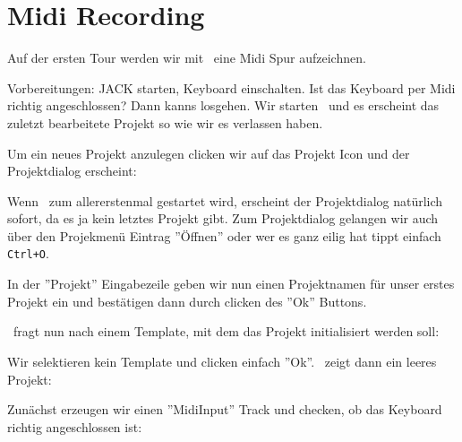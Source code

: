 \section{Midi Recording}
      Auf der ersten Tour werden wir mit \M\ eine Midi Spur
      aufzeichnen.

      Vorbereitungen: JACK starten, Keyboard einschalten. 
      Ist das Keyboard per Midi richtig angeschlossen? 
      Dann kanns losgehen. Wir starten \M\ und es erscheint das
      zuletzt bearbeitete Projekt so wie wir es verlassen haben.

      Um ein neues Projekt anzulegen clicken wir auf das Projekt
      Icon und der Projektdialog erscheint:


      Wenn \M\ zum allererstenmal gestartet wird, erscheint der
      Projektdialog natürlich sofort, da es ja kein letztes Projekt
      gibt. Zum Projektdialog gelangen wir auch über den Projekmenü
      Eintrag ''Öffnen'' oder wer es ganz eilig hat tippt einfach
      {\tt Ctrl+O}.

      In der ''Projekt'' Eingabezeile geben wir nun einen Projektnamen
      für unser erstes Projekt ein und bestätigen dann durch clicken
      des ''Ok'' Buttons.

      \M\ fragt nun nach einem Template, mit dem das Projekt
      initialisiert werden soll:


      Wir selektieren kein Template und clicken einfach ''Ok''.
      \M\ zeigt dann ein leeres Projekt:


      Zunächst erzeugen wir einen ''MidiInput'' Track und checken,
      ob das Keyboard richtig angeschlossen ist:

      

